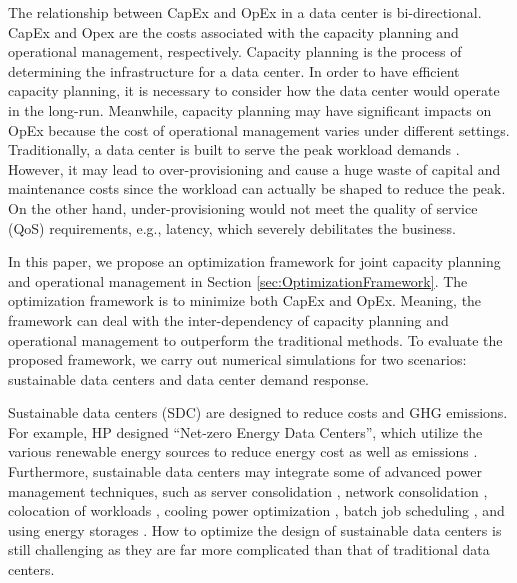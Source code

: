 
The relationship between CapEx and OpEx in a data center is bi-directional. CapEx and Opex are the costs associated with the capacity planning and operational management, respectively. Capacity planning is the process of determining the infrastructure for a data center. In order to have efficient capacity planning, it is necessary to consider how the data center would operate in the long-run. Meanwhile, capacity planning may have significant impacts on OpEx because the cost of operational management varies under different settings. Traditionally, a data center is built to serve the peak workload demands \cite{ren2012carbon}. However, it may lead to over-provisioning and cause a huge waste of capital and maintenance costs since the workload can actually be shaped to reduce the peak. On the other hand, under-provisioning would not meet the quality of service (QoS) requirements, e.g., latency, which severely debilitates the business. 


In this paper, we propose an optimization framework for joint capacity planning and operational management in Section \ref{sec:OptimizationFramework}. The optimization framework is to minimize both CapEx and OpEx. Meaning, the framework can deal with the inter-dependency of capacity planning and operational management to outperform the traditional methods. To evaluate the proposed framework, we carry out numerical simulations for two scenarios: sustainable data centers and data center demand response.


Sustainable data centers (SDC) \cite{weihl2011sustainable} are designed to reduce costs and GHG emissions. For example, HP designed ``Net-zero Energy Data Centers'', which utilize the various renewable energy sources to reduce energy cost as well as emissions \cite{arlitt2012towards}. Furthermore, sustainable data centers may integrate some of advanced power management techniques, such as server consolidation \cite{lin2013dynamic,zhang2012dynamic,lin2011online}, network consolidation \cite{zhang2010greente,andrews2012routing,sharmashrink}, colocation of workloads \cite{aksanli2012utilizing}, cooling power optimization \cite{liu2012renewable,pakbaznia2009minimizing}, batch job scheduling \cite{mukherjee2009spatio,garg2011sla}, and using energy storages \cite{urgaonkar2011optimal,liu2012renewable,liu2013data}. How to optimize the design of sustainable data centers is still challenging as they are far more complicated than that of traditional data centers.

